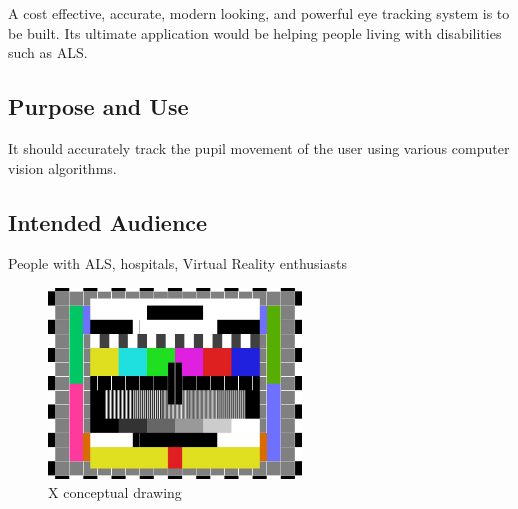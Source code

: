 A cost effective, accurate, modern looking, and powerful eye tracking system is to be built. Its ultimate application would be  helping people living with disabilities such as ALS. 

\subsection{Purpose and Use}
It should accurately track the pupil movement of the user using various computer vision algorithms. 

\subsection{Intended Audience}
People with ALS, hospitals, Virtual Reality enthusiasts 

\begin{figure}[h!]
	\centering
   	\includegraphics[width=0.60\textwidth]{images/test_image}
    \caption{X conceptual drawing}
\end{figure}

